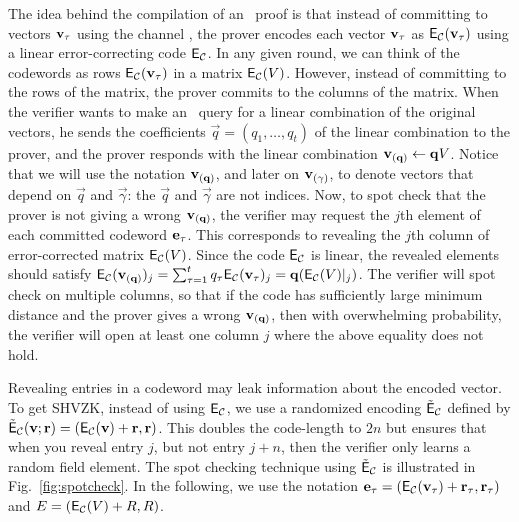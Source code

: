 The idea behind the compilation of an \ILC\ proof is that instead of committing to vectors ${\mathbf{v}}_\tau$ using the channel \ILC, the prover encodes each vector ${\mathbf{v}}_\tau$ as $\mathsf{E}_{\mathcal{C}}({\mathbf{v}}_\tau)$ using a linear error-correcting code $\mathsf{E}_{\mathcal{C}}$. In any given round, we can think of the codewords as rows $\mathsf{E}_{\mathcal{C}}({\mathbf{v}}_\tau)$ in a matrix $\mathsf{E}_{\mathcal{C}}(V)$. However, instead of committing to the rows of the matrix, the prover commits to the columns of the matrix. When the verifier wants to make an \ILCopen\ query for a linear combination of the original vectors, he sends the coefficients $\vec{q}=(q_1,\ldots,q_t)$ of the linear combination to the prover, and the prover responds with the linear combination ${\mathbf{v}}_{(\mathbf{q})}\gets \mathbf{q} V$. 
Notice that we will use the notation ${\mathbf{v}}_{(\mathbf{q})}$, and later on ${\mathbf{v}}_{(\mathbf{\gamma})}$, to denote vectors that depend on $\vec{q}$ and $\vec{\gamma}$: the $\vec{q}$ and $\vec{\gamma}$ are not indices. 
Now, to spot check that the prover is not giving a wrong ${\mathbf{v}}_{(\mathbf{q})}$, the verifier may request the $j$th element of each committed codeword $\mathbf{e}_\tau$. This corresponds to revealing the $j$th column of error-corrected matrix $\mathsf{E}_{\mathcal{C}}(V)$. Since the code $\mathsf{E}_{\mathcal{C}}$ is linear, the revealed elements should satisfy $\mathsf{E}_{\mathcal{C}}({\mathbf{v}}_{(\mathbf{q})})_j=\sum_{\tau=1}^tq_\tau \mathsf{E}_{\mathcal{C}}(\mathbf{v}_\tau)_{j}=\mathbf{q} (\mathsf{E}_{\mathcal{C}}(V)|_{j})$. The verifier will spot check on multiple columns, so that if the code has sufficiently large minimum distance and the prover gives a wrong ${\mathbf{v}}_{(\mathbf{q})}$, then with overwhelming probability, the verifier will  open at least one column $j$ where the above equality does not hold.

Revealing entries in a codeword may leak information about the encoded vector. To get SHVZK, instead of using $\mathsf{E}_{\mathcal{C}}$, we use a randomized encoding $\tilde{\mathsf{E}}_{\mathcal{C}}$ defined by $\tilde{\mathsf{E}}_{\mathcal{C}}({\mathbf{v}};\mathbf{r})=(\mathsf{E}_{\mathcal{C}}({\mathbf{v}})+\mathbf{r},\mathbf{r})$. This doubles the code-length to $2n$ but ensures that when you reveal entry $j$, but not entry $j+n$, then the verifier only learns a random field element. The spot checking technique using $\tilde{\mathsf{E}}_{\mathcal{C}}$ is illustrated in Fig.~\ref{fig:spotcheck}. In the following, we use the notation $\mathbf{e}_\tau=(\mathsf{E}_{\mathcal{C}}({\mathbf{v}}_\tau)+\mathbf{r}_\tau,\mathbf{r}_\tau)$ and $E=(\mathsf{E}_{\mathcal{C}}(V)+R,R)$.

